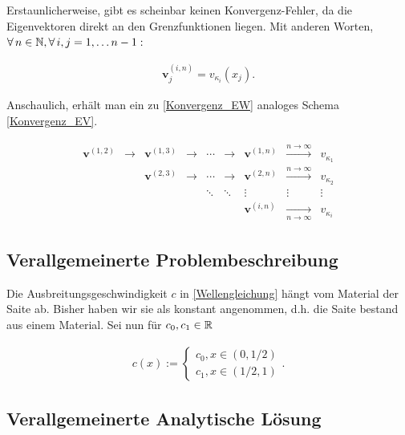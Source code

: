 Erstaunlicherweise, gibt es scheinbar keinen Konvergenz-Fehler, da die Eigenvektoren direkt an den Grenzfunktionen liegen. Mit anderen Worten, $\forall \, n \in \mathbb{N}, \forall \, i, j = 1, \ldots n-1:$

\begin{align*}
  \mathbf{v}^{(i, n)}_j = v_{\kappa_i}(x_j).
\end{align*}

Anschaulich, erhält man ein zu \eqref{Konvergenz_EW} analoges Schema \eqref{Konvergenz_EV}.

\begin{align} \label{Konvergenz_EV}
\begin{array}{ccccccccc}
\mathbf{v}^{(1, 2)} & \rightarrow & \mathbf{v}^{(1, 3)} & \rightarrow & \cdots & \rightarrow & \mathbf{v}^{(1, n)} & \xrightarrow{n \to \infty}   & v_{\kappa_1} \\
                &             & \mathbf{v}^{(2, 3)} & \rightarrow & \cdots & \rightarrow & \mathbf{v}^{(2, n)} & \xrightarrow{n \to \infty}   & v_{\kappa_2} \\
                &             &                 &             & \ddots & \ddots      & \vdots          & \vdots                       & \vdots       \\
                &             &                 &             &        &             & \mathbf{v}^{(i, n)} & \xrightarrow[n \to \infty]{} & v_{\kappa_i}
\end{array}
\end{align}

\subsection{Verallgemeinerte Problembeschreibung}

Die Ausbreitungsgeschwindigkeit $c$ in \eqref{Wellengleichung} hängt vom Material der Saite ab. Bisher haben wir sie als konstant angenommen, d.h. die Saite bestand aus einem Material. Sei nun für $c_0, c_1 \in \mathbb{R}$

\begin{align} \label{Material-Funktion}
  c(x) :=
  \begin{cases}
    c_0, x \in (0, 1/2) \\
    c_1, x \in (1/2, 1)
  \end{cases}.
\end{align}

\subsection{Verallgemeinerte Analytische Lösung}

